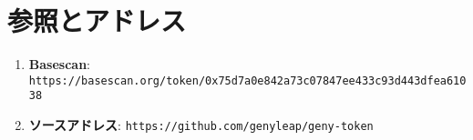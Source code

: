 \documentclass[a4paper,12pt,openany]{book}
\begin{document}
\section*{参照とアドレス}

\begin{enumerate}
    \item \textbf{Basescan}: \texttt{https://basescan.org/token/0x75d7a0e842a73c07847ee433c93d443dfea61038}
    \item \textbf{ソースアドレス}: \texttt{https://github.com/genyleap/geny-token}
\end{enumerate}
\end{document}
